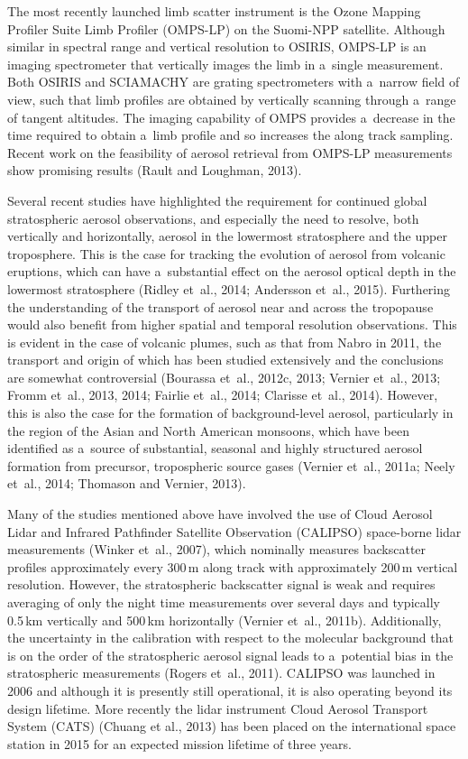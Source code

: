 \documentclass[amtd, online, hvmath]{copernicus}
\begin{document}
The most recently launched limb scatter instrument is the Ozone
Mapping Profiler Suite Limb Profiler (OMPS-LP) on the Suomi-NPP
satellite. Although similar in spectral range and vertical resolution
to OSIRIS, OMPS-LP is an imaging spectrometer that vertically images
the limb in a~single measurement. Both OSIRIS and SCIAMACHY are
grating spectrometers with a~narrow field of view, such that limb
profiles are obtained by vertically scanning through a~range of
tangent altitudes. The imaging capability of OMPS provides a~decrease
in the time required to obtain a~limb profile and so increases the
along track sampling. Recent work on the feasibility of aerosol
retrieval from OMPS-LP measurements show promising results (Rault and
Loughman, 2013).

Several recent studies have highlighted the requirement for continued global
stratospheric aerosol observations, and especially the need to resolve, both
vertically and horizontally, aerosol in the lowermost stratosphere and the
upper troposphere. This is the case for tracking the evolution of aerosol
from volcanic eruptions, which can have a~substantial effect on the aerosol
optical depth in the lowermost stratosphere (Ridley et~al., 2014; Andersson
et~al., 2015). Furthering the understanding of the transport of aerosol near
and across the tropopause would also benefit from higher spatial and temporal
resolution observations. This is evident in the case of volcanic plumes, such
as that from Nabro in 2011, the transport and origin of which has been
studied extensively and the conclusions are somewhat controversial (Bourassa et~al., 2012c,
2013; Vernier et~al., 2013; Fromm et~al., 2013, 2014; Fairlie et~al., 2014;
Clarisse et~al., 2014). However, this is also the case for the formation of
background-level aerosol, particularly in the region of the Asian and North
American monsoons, which have been identified as a~source of substantial,
seasonal and highly structured aerosol formation from precursor, tropospheric
source gases (Vernier et~al., 2011a; Neely et~al., 2014; Thomason and
Vernier, 2013).

Many of the studies mentioned above have involved the use of Cloud
Aerosol Lidar and Infrared Pathfinder Satellite Observation (CALIPSO)
space-borne lidar measurements (Winker et~al., 2007), which nominally
measures backscatter profiles approximately every 300\,\unit{m} along
track with approximately 200\,\unit{m} vertical resolution. However,
the stratospheric backscatter signal is weak and requires averaging of
only the night time measurements over several days and typically
0.5\,\unit{km} vertically and 500\,\unit{km} horizontally (Vernier
et~al., 2011b). Additionally, the uncertainty in the calibration with
respect to the molecular background that is on the order of the
stratospheric aerosol signal leads to a~potential bias in the
stratospheric measurements (Rogers et~al., 2011). CALIPSO was launched
in 2006 and although it is presently still operational, it is also
operating beyond its design lifetime. More recently the lidar instrument Cloud Aerosol Transport System (CATS) (Chuang et al., 2013) has been placed on the international space station in 2015 for an expected mission lifetime of three years.
\end{document}
